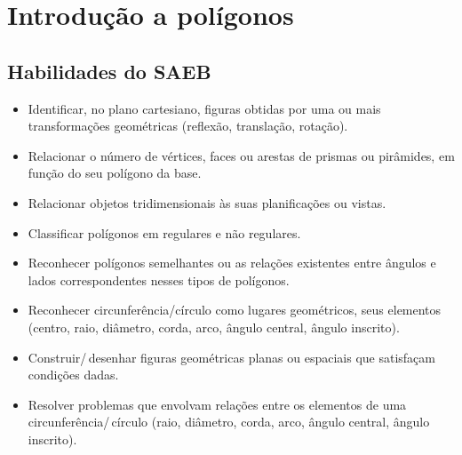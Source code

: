 

\chapter{Introdução a polígonos}

\section{Habilidades do SAEB} 
\begin{itemize}
\item Identificar, no plano cartesiano, figuras obtidas
por uma ou mais transformações geométricas (reflexão, translação,
rotação).
\item
  Relacionar o número de vértices, faces ou arestas de prismas ou
  pirâmides, em função do seu polígono da base.
\item
  Relacionar objetos tridimensionais às suas planificações ou vistas.
\item
  Classificar polígonos em regulares e não regulares.
\item
  Reconhecer polígonos semelhantes ou as relações existentes entre
  ângulos e lados correspondentes nesses tipos de polígonos.
\item
  Reconhecer circunferência/círculo como lugares geométricos, seus
  elementos (centro, raio, diâmetro, corda, arco, ângulo central, ângulo
  inscrito).
\item
  Construir/\,desenhar figuras geométricas planas ou espaciais que
  satisfaçam condições dadas.
\item
  Resolver problemas que envolvam relações entre os elementos de uma
  circunferência/\,círculo (raio, diâmetro, corda, arco, ângulo central,
  ângulo inscrito).
\end{itemize}

